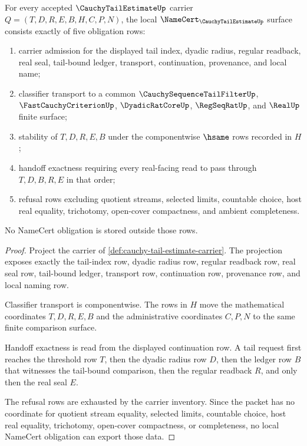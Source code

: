 \begin{theorem}
\label{thm:cauchy-tail-estimate-namecert-obligations}
For every accepted $\CauchyTailEstimateUp$ carrier $Q=(T,D,R,E,B,H,C,P,N)$, the local $\NameCert_{\CauchyTailEstimateUp}$ surface consists exactly of five obligation rows:
\begin{enumerate}
\item carrier admission for the displayed tail index, dyadic radius, regular readback, real seal, tail-bound ledger, transport, continuation, provenance, and local name;
\item classifier transport to a common $\CauchySequenceTailFilterUp$, $\FastCauchyCriterionUp$, $\DyadicRatCoreUp$, $\RegSeqRatUp$, and $\RealUp$ finite surface;
\item stability of $T,D,R,E,B$ under the componentwise $\hsame$ rows recorded in $H$;
\item handoff exactness requiring every real-facing read to pass through $T,D,B,R,E$ in that order;
\item refusal rows excluding quotient streams, selected limits, countable choice, host real equality, trichotomy, open-cover compactness, and ambient completeness.
\end{enumerate}
No NameCert obligation is stored outside those rows.
\end{theorem}
\begin{proof}
Project the carrier of \autoref{def:cauchy-tail-estimate-carrier}. The projection exposes exactly the tail-index row, dyadic radius row, regular readback row, real seal row, tail-bound ledger, transport row, continuation row, provenance row, and local naming row.

Classifier transport is componentwise. The rows in $H$ move the mathematical coordinates $T,D,R,E,B$ and the administrative coordinates $C,P,N$ to the same finite comparison surface.

Handoff exactness is read from the displayed continuation row. A tail request first reaches the threshold row $T$, then the dyadic radius row $D$, then the ledger row $B$ that witnesses the tail-bound comparison, then the regular readback $R$, and only then the real seal $E$.

The refusal rows are exhausted by the carrier inventory. Since the packet has no coordinate for quotient stream equality, selected limits, countable choice, host real equality, trichotomy, open-cover compactness, or completeness, no local NameCert obligation can export those data.
\end{proof}

